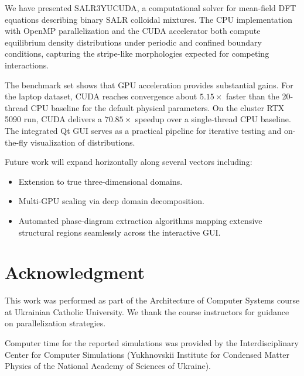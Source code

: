 \documentclass[conference]{IEEEtran}
\begin{document}
We have presented SALR3YUCUDA, a computational solver for mean-field DFT equations describing binary SALR colloidal mixtures. The CPU implementation with OpenMP parallelization and the CUDA accelerator both compute equilibrium density distributions under periodic and confined boundary conditions, capturing the stripe-like morphologies expected for competing interactions.

The benchmark set shows that GPU acceleration provides substantial gains. For the laptop dataset, CUDA reaches convergence about $5.15\times$ faster than the 20-thread CPU baseline for the default physical parameters. On the cluster RTX 5090 run, CUDA delivers a $70.85\times$ speedup over a single-thread CPU baseline. The integrated Qt GUI serves as a practical pipeline for iterative testing and on-the-fly visualization of distributions.

Future work will expand horizontally along several vectors including:
\begin{itemize}
    \item Extension to true three-dimensional domains.
    \item Multi-GPU scaling via deep domain decomposition.
    \item Automated phase-diagram extraction algorithms mapping extensive structural regions seamlessly across the interactive GUI.
\end{itemize}

\section*{Acknowledgment}

This work was performed as part of the Architecture of Computer Systems course at Ukrainian Catholic University. We thank the course instructors for guidance on parallelization strategies.

Computer time for the reported simulations was provided by the Interdisciplinary Center for Computer Simulations (Yukhnovskii Institute for Condensed Matter Physics of the National Academy of Sciences of Ukraine).
\end{document}
